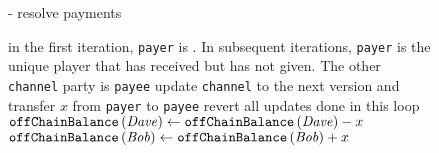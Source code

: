 \begin{figure}[H]
\begin{systembox}{\fpaynet{} - resolve payments}
\begin{algorithmic}[1]
                \State in the first iteration, \texttt{payer} is \dave. In
                subsequent iterations, \texttt{payer} is the unique player that
                has received but has not given. The other \texttt{channel} party
                is \texttt{payee}
                  \State update \texttt{channel} to the next version and
                  transfer $x$ from \texttt{payer} to \texttt{payee}
                  \label{alg:fpaynet:resolvepay:update}
                \Else
                  \State revert all updates done in this loop
                \EndIf
              \EndFor
                \State $\mathtt{offChainBalance}\left(\mathit{Dave}\right) \gets
                \mathtt{offChainBalance}\left(\mathit{Dave}\right) - x$
              \EndIf
              \State $\mathtt{offChainBalance}\left(\mathit{Bob}\right) \gets
              \mathtt{offChainBalance}\left(\mathit{Bob}\right) + x$
            \EndFor
          \EndFor
        \EndIndent
      \end{algorithmic}
    \end{systembox}
    \caption{}
    \label{alg:fpaynet:resolvepay}
  \end{figure}

